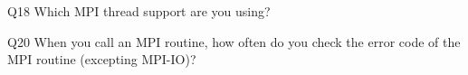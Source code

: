 \begin{description}%
\item{Q18} Which MPI thread support are you using?%
\item{Q20} When you call an MPI routine, how often do you check the error code of the MPI routine  (excepting MPI-IO)?%
\end{description}%

